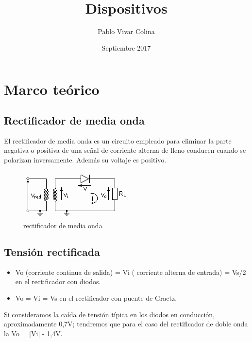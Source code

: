 \documentclass{article}
\title{Dispositivos}
\author{Pablo Vivar Colina}
\date{Septiembre 2017}
\begin{document}


\section{Marco teórico}

\subsection{Rectificador de media onda}

El rectificador de media onda es un circuito empleado para eliminar la parte negativa o positiva de una señal de corriente alterna de lleno conducen cuando se polarizan inversamente. Además su voltaje es positivo.\citep{circuitoMediaOnda}

\begin{figure}[h!]
    \centering
    \includegraphics{Circuito_rectificador_media_onda.png}
    \caption{rectificador de media onda}
    \label{fig:rectificadorMedia}
\end{figure}

\subsection{Tensión rectificada}

\begin{itemize}
    \item  Vo (corriente continua de salida) = Vi ( corriente alterna de entrada) = Vs/2 en el rectificador con diodos.
    \item  Vo = Vi = Vs en el rectificador con puente de Graetz.
\end{itemize}

   

Si consideramos la caída de tensión típica en los diodos en conducción, aproximadamente 0,7V; tendremos que para el caso del rectificador de doble onda la Vo = |Vi| - 1,4V.\citep{circuitoOnda}\\
\end{document}
